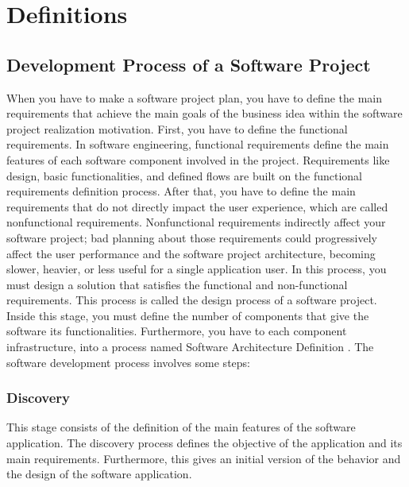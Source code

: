 
\chapter{Definitions}
\label{cha:definitions}

\section{Development Process of a Software Project}
When you have to make a software project plan, you have to define the main requirements that achieve the main goals of the business idea within the software project realization motivation. First, you have to define the functional requirements. In software engineering, functional requirements define the main features of each software component involved in the project. Requirements like design, basic functionalities, and defined flows are built on the functional requirements definition process.
After that, you have to define the main requirements that do not directly impact the user experience, which are called nonfunctional requirements. Nonfunctional requirements indirectly affect your software project; bad planning about those requirements could progressively affect the user performance and the software project architecture, becoming slower, heavier, or less useful for a single application user. In this process, you must design a solution that satisfies the functional and non-functional requirements. This process is called the design process of a software project. Inside this stage, you must define the number of components that give the software its functionalities. Furthermore, you have to each component infrastructure, into a process named Software Architecture Definition \citet{software-engineering-book}.  The software development process involves some steps: 

\subsection{Discovery}
This stage consists of the definition of the main features of the software application. The discovery process defines the objective of the application and its main requirements. Furthermore, this gives an initial version of the behavior and the design of the software application.


